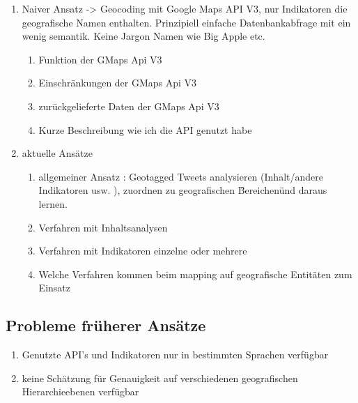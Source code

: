 		\begin{enumerate}
			\item Naiver Ansatz -> Geocoding mit Google Maps API V3, nur Indikatoren die geografische Namen enthalten. 
					Prinzipiell einfache Datenbankabfrage mit ein wenig semantik. 
					Keine Jargon Namen wie Big Apple etc.
				\begin{enumerate}
					\item Funktion der GMaps Api V3
					\item Einschränkungen der GMaps Api V3
					\item zurückgelieferte Daten der GMaps Api V3
					\item Kurze Beschreibung wie ich die API genutzt habe
				\end{enumerate}
			\item aktuelle Ansätze
				\begin{enumerate}
					\item{ 
					allgemeiner Ansatz : Geotagged Tweets analysieren (Inhalt/andere Indikatoren usw. ), zuordnen zu geografischen \"Bereichen\" und daraus lernen.}
					\item Verfahren mit Inhaltsanalysen
					\item Verfahren mit Indikatoren einzelne oder mehrere
					\item Welche Verfahren kommen beim mapping auf  geografische Entitäten zum Einsatz
				\end{enumerate}
		\end{enumerate}

		\subsection{Probleme früherer Ansätze}
			\begin{enumerate}
				\item{Genutzte API's und Indikatoren nur in bestimmten Sprachen verfügbar}
				\item{keine Schätzung für Genauigkeit auf verschiedenen geografischen Hierarchieebenen verfügbar}  
			\end{enumerate}

